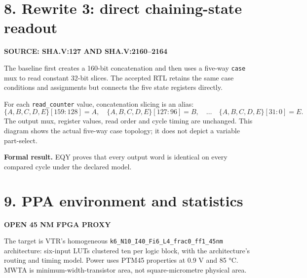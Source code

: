 \documentclass[10pt,a4paper]{article}
\newcommand{\smallcaps}[1]{\textcolor{Mid}{\fontsize{8.5}{10}\selectfont\bfseries\MakeUppercase{#1}}}
\newcommand{\newpageheading}[2]{\clearpage\section{#1}\smallcaps{#2}\vspace{6pt}}
\begin{document}
\newpageheading{8. Rewrite 3: direct chaining-state readout}{Source: sha.v:127 and sha.v:2160--2164}

The baseline first creates a 160-bit concatenation and then uses a five-way \texttt{case} mux to read constant 32-bit slices. The accepted RTL retains the same case conditions and assignments but connects the five state registers directly.

\begin{center}
\end{center}

For each \texttt{read\_counter} value, concatenation slicing is an alias:
\[
\{A,B,C,D,E\}[159{:}128]=A,\quad
\{A,B,C,D,E\}[127{:}96]=B,\quad\ldots\quad
\{A,B,C,D,E\}[31{:}0]=E.
\]
The output mux, register values, read order and cycle timing are unchanged. This diagram shows the actual five-way case topology; it does not depict a variable part-select.

\begin{claimbox}\textbf{Formal result.} EQY proves that every output word is identical on every compared cycle under the declared model.\end{claimbox}

\newpageheading{9. PPA environment and statistics}{Open 45 nm FPGA proxy}

The target is VTR's homogeneous \texttt{k6\_N10\_I40\_Fi6\_L4\_frac0\_ff1\_45nm} architecture: six-input LUTs clustered ten per logic block, with the architecture's routing and timing model. Power uses PTM45 properties at 0.9 V and 85 °C. MWTA is minimum-width-transistor area, not square-micrometre physical area.
\end{document}
